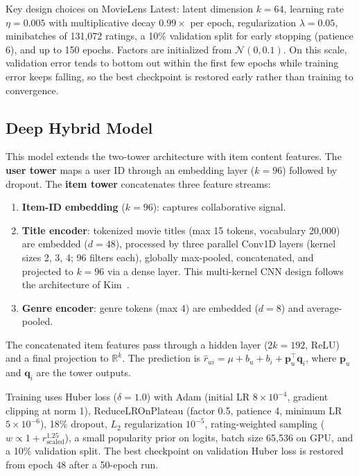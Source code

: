 \documentclass[11pt]{article}
\begin{document}
Key design choices on MovieLens Latest: latent dimension $k{=}64$, learning rate $\eta{=}0.005$ with multiplicative decay $0.99{\times}$ per epoch, regularization $\lambda{=}0.05$, minibatches of 131{,}072 ratings, a 10\% validation split for early stopping (patience 6), and up to 150 epochs.
Factors are initialized from $\mathcal{N}(0,0.1)$.
On this scale, validation error tends to bottom out within the first few epochs while training error keeps falling, so the best checkpoint is restored early rather than training to convergence.

\subsection{Deep Hybrid Model}

This model extends the two-tower architecture with item content features.
The \textbf{user tower} maps a user ID through an embedding layer ($k{=}96$) followed by dropout.
The \textbf{item tower} concatenates three feature streams:

\begin{enumerate}
\item \textbf{Item-ID embedding} ($k{=}96$): captures collaborative signal.
\item \textbf{Title encoder}: tokenized movie titles (max 15 tokens, vocabulary 20{,}000) are embedded ($d{=}48$), processed by three parallel Conv1D layers (kernel sizes 2, 3, 4; 96 filters each), globally max-pooled, concatenated, and projected to $k{=}96$ via a dense layer.
This multi-kernel CNN design follows the architecture of Kim~\cite{kim2014convolutional}.
\item \textbf{Genre encoder}: genre tokens (max 4) are embedded ($d{=}8$) and average-pooled.
\end{enumerate}

The concatenated item features pass through a hidden layer ($2k{=}192$, ReLU) and a final projection to $\mathbb{R}^k$.
The prediction is $\hat{r}_{ui} = \mu + b_u + b_i + \mathbf{p}_u^\top \mathbf{q}_i$, where $\mathbf{p}_u$ and $\mathbf{q}_i$ are the tower outputs.

Training uses Huber loss ($\delta{=}1.0$) with Adam (initial LR $8{\times}10^{-4}$, gradient clipping at norm 1), ReduceLROnPlateau (factor 0.5, patience 4, minimum LR $5{\times}10^{-6}$), 18\% dropout, $L_2$ regularization $10^{-5}$, rating-weighted sampling ($w \propto 1 + r_\text{scaled}^{1.25}$), a small popularity prior on logits, batch size 65{,}536 on GPU, and a 10\% validation split.
The best checkpoint on validation Huber loss is restored from epoch 48 after a 50-epoch run.
\end{document}

